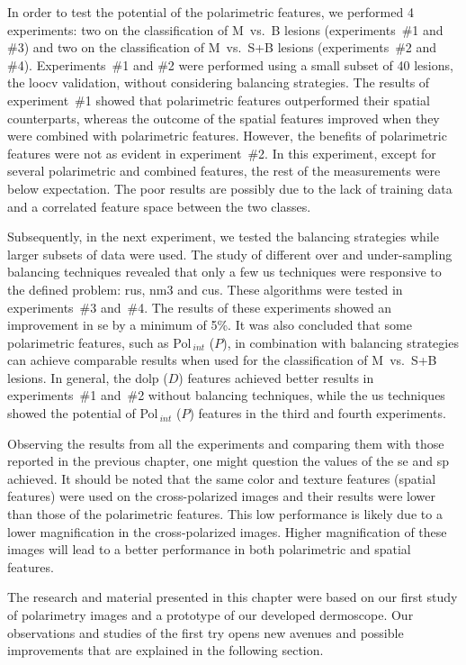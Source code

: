 In order to test the potential of the polarimetric features, we performed 4 experiments: two on the classification of M~vs.~B lesions (experiments~\#1 and \#3) and two on the classification of M~vs.~S+B lesions (experiments~\#2 and \#4). 
Experiments~\#1 and \#2 were performed using a small subset of 40 lesions, the \ac{loocv} validation, without considering balancing strategies.
The results of experiment~\#1 showed that polarimetric features outperformed their spatial counterparts, whereas the outcome of the spatial features improved when they were combined with polarimetric features. 
However, the benefits of polarimetric features were not as evident in experiment~\#2. 
In this experiment, except for several polarimetric and combined features, the rest of the measurements were below expectation.
The poor results are possibly due to the lack of training data and a correlated feature space between the two classes.


Subsequently, in the next experiment, we tested the balancing strategies while larger subsets of data were used.
The study of different over and under-sampling balancing techniques revealed that only a few \ac{us} techniques were responsive to the defined problem: \ac{rus}, \ac{nm3} and \ac{cus}. 
These algorithms were tested in experiments~\#3 and~\#4.
The results of these experiments showed an improvement in \ac{se} by a minimum of 5\%. 
It was also concluded that some polarimetric features, such as Pol$_{~int}$ ($P$), in combination with balancing strategies can achieve comparable results when used for the classification of M~vs.~S+B lesions.
In general, the \ac{dolp} ($D$) features achieved better results in experiments~\#1 and~\#2 without balancing techniques, while the \ac{us} techniques showed the potential of Pol$_{~int}$ ($P$) features in the third and fourth experiments.

Observing the results from all the experiments and comparing them with those reported in the previous chapter, one might question the values of the \ac{se} and \ac{sp} achieved.
It should be noted that the same color and texture features (spatial features) were used on the cross-polarized images and their results were lower than those of the polarimetric features.
This low performance is likely due to a lower magnification in the cross-polarized images.
Higher magnification of these images will lead to a better performance in both polarimetric and spatial features.

The research and material presented in this chapter were based on our first study of polarimetry images and a prototype of our developed dermoscope.
Our observations and studies of the first try opens new avenues and possible improvements that are explained in the following section. 

